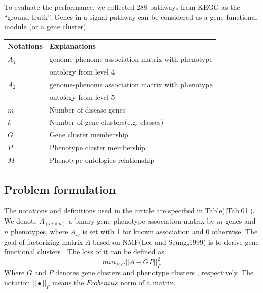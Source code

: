 \documentclass{bmcart}
\begin{document}
To evaluate the performance, we collected 288 pathways from KEGG as the ``ground truth''. Genes in a signal pathway can be considered as a gene functional module (or a gene cluster).
\begin{table}[!t]
\begin{tabular}{ll}
    \hline
    Notations & Explanations\\
    \hline\hline
    $A_1$ & genome-phenome association matrix with phenotype\\
    & ontology from level 4\\
    $A_2$ & genome-phenome association matrix with phenotype\\
    & ontology from level 5\\
    $m$ & Number of disease genes\\
    $k$ & Number of gene clusters(e.g. classes)\\
    $G$ & Gene cluster membership\\
    $P$ & Phenotype cluster membership\\
    $M$ & Phenotype ontologies relationship\\
    \hline
  \end{tabular}
\end{table}

\subsection*{Problem formulation}
The notations and definitions used in the article are specified in Table(\ref{Tab:01}).
We denote $A_{(m \times n)}$ a binary gene-phenotype association matrix by $m$ genes and $n$ phenotypes, where $A_{ij}$ is set with 1 for known association and 0 otherwise. The goal of factorizing matrix $A$ based on NMF(Lee and Seung,1999) is to derive gene functional clusters . The loss of it can be defined as:
\begin{equation}\label{equ:NMF}
min _{P,G} ||A-GP||^{2}_{F}
\end{equation}
Where $G$ and $P$ denotes gene clusters and phenotype clusters , respectively. The notation $||\bullet||_F$ means the $Frobenius$ norm of a matrix.
\end{document}
